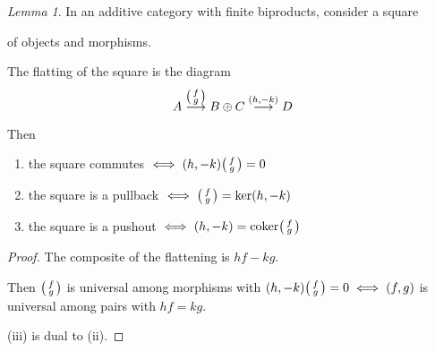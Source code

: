 \documentclass[a4paper]{article}
\theoremstyle{definition}
\theoremstyle{remark}
\theoremstyle{default}
\newtheorem{lemma}[definition]{Lemma}
\numberwithin{definition}{section}
\DeclareMathOperator{\coker}{coker}
\begin{document}
\begin{lemma}
	In an additive category with finite biproducts,
	consider a square
	of objects and morphisms.
	
	The flatting of the square is the diagram
	$$A \overset{\begin{psmallmatrix}f\\g\end{psmallmatrix}}{\longrightarrow} B \oplus C \overset{(h, -k)}{\longrightarrow} D$$
	
	Then
	\begin{enumerate}[label=\roman*.]
		\item the square commutes $\iff (h, -k)\begin{psmallmatrix}f\\g\end{psmallmatrix} = 0$
		\item the square is a pullback $\iff \begin{psmallmatrix}f\\g\end{psmallmatrix} = \ker(h, -k)$
		\item the square is a pushout $\iff (h, -k) = \coker \begin{psmallmatrix}f\\g\end{psmallmatrix}$
	\end{enumerate}
\end{lemma}
\begin{proof}
	The composite of the flattening is $hf-kg$.
	
	Then $\begin{psmallmatrix}f\\g\end{psmallmatrix}$ is universal among morphisms with $(h, -k)\begin{psmallmatrix}f\\g\end{psmallmatrix} = 0 \iff (f,g)$ is universal among pairs with $hf=kg$.
	
	(iii) is dual to (ii).
\end{proof}
\end{document}
